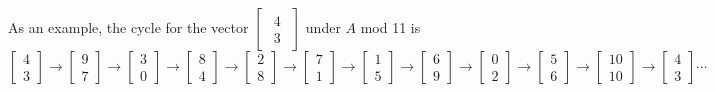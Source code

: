 \documentclass[a4paper, 12pt, reqno]{amsart}
\begin{document}
			As an example, the cycle for the vector 
			$
				\begin{bmatrix}
					\begin{smallmatrix}
						4 \\
						3
					\end{smallmatrix}
				\end{bmatrix}
			$
			under $A$ mod 11 is
			\[
				\begin{bmatrix}
					4 \\
					3
				\end{bmatrix}
				\rightarrow
				\begin{bmatrix}
					9 \\
					7
				\end{bmatrix}
				\rightarrow
				\begin{bmatrix}
					3 \\
					0
				\end{bmatrix}
				\rightarrow
				\begin{bmatrix}
					8 \\
					4
				\end{bmatrix}
				\rightarrow
				\begin{bmatrix}
					2 \\
					8
				\end{bmatrix}
				\rightarrow
				\begin{bmatrix}
					7 \\
					1
				\end{bmatrix}
				\rightarrow
				\begin{bmatrix}
					1 \\
					5
				\end{bmatrix}
				\rightarrow
				\begin{bmatrix}
					6 \\
					9
				\end{bmatrix}
				\rightarrow
				\begin{bmatrix}
					0 \\
					2
				\end{bmatrix}
				\rightarrow
				\begin{bmatrix}
					5 \\
					6
				\end{bmatrix}
				\rightarrow
				\begin{bmatrix}
					10 \\
					10
				\end{bmatrix}
				\rightarrow
				\begin{bmatrix}
					4 \\
					3
				\end{bmatrix}
				\cdots
			\]
			
\end{document}
